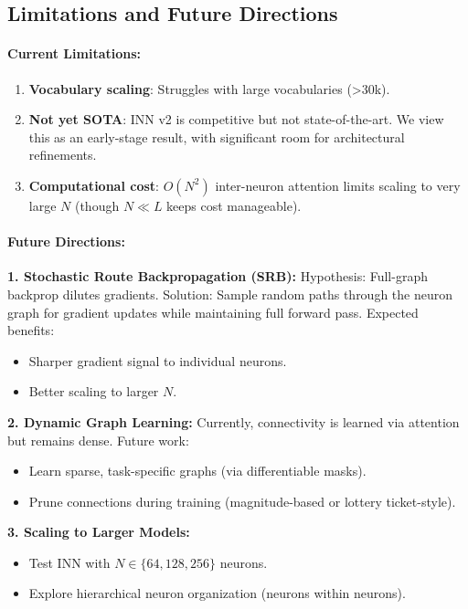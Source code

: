 \documentclass{article}
\begin{document}
\subsection{Limitations and Future Directions}

\paragraph{Current Limitations:}
\begin{enumerate}
    \item \textbf{Vocabulary scaling}: Struggles with large vocabularies (>30k).
    \item \textbf{Not yet SOTA}: INN v2 is competitive but not state-of-the-art. We view this as an early-stage result, with significant room for architectural refinements.
    \item \textbf{Computational cost}: $O(N^2)$ inter-neuron attention limits scaling to very large $N$ (though $N \ll L$ keeps cost manageable).
\end{enumerate}

\paragraph{Future Directions:}

\textbf{1. Stochastic Route Backpropagation (SRB):}
Hypothesis: Full-graph backprop dilutes gradients. Solution: Sample random paths through the neuron graph for gradient updates while maintaining full forward pass. Expected benefits:
\begin{itemize}
    \item Sharper gradient signal to individual neurons.
    \item Better scaling to larger $N$.
\end{itemize}

\textbf{2. Dynamic Graph Learning:}
Currently, connectivity is learned via attention but remains dense. Future work:
\begin{itemize}
    \item Learn sparse, task-specific graphs (via differentiable masks).
    \item Prune connections during training (magnitude-based or lottery ticket-style).
\end{itemize}

\textbf{3. Scaling to Larger Models:}
\begin{itemize}
    \item Test INN with $N \in \{64, 128, 256\}$ neurons.
    \item Explore hierarchical neuron organization (neurons within neurons).
\end{itemize}
\end{document}
